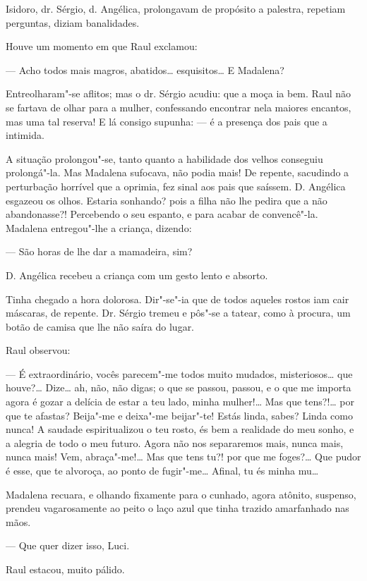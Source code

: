 Isidoro, dr. Sérgio, d. Angélica, prolongavam de propósito a palestra,
repetiam perguntas, diziam banalidades.

Houve um momento em que Raul exclamou:

--- Acho todos mais magros, abatidos\ldots{} esquisitos\ldots{} E Madalena?

Entreolharam"-se aflitos; mas o dr. Sérgio acudiu: que a moça ia bem.
Raul não se fartava de olhar para a mulher, confessando encontrar nela
maiores encantos, mas uma tal reserva! E lá consigo supunha: --- é a
presença dos pais que a intimida.

A situação prolongou"-se, tanto quanto a habilidade dos velhos conseguiu
prolongá"-la. Mas Madalena sufocava, não podia mais! De repente,
sacudindo a perturbação horrível que a oprimia, fez sinal aos pais que
saíssem. D. Angélica esgazeou os olhos. Estaria sonhando? pois a filha
não lhe pedira que a não abandonasse?! Percebendo o seu espanto, e para
acabar de convencê"-la. Madalena entregou"-lhe a criança, dizendo:

--- São horas de lhe dar a mamadeira, sim?

D. Angélica recebeu a criança com um gesto lento e absorto.

Tinha chegado a hora dolorosa. Dir"-se"-ia que de todos aqueles rostos iam
cair máscaras, de repente. Dr. Sérgio tremeu e pôs"-se a tatear, como à
procura, um botão de camisa que lhe não saíra do lugar.

Raul observou:

--- É extraordinário, vocês parecem"-me todos muito mudados,
misteriosos\ldots{} que houve?\ldots{} Dize\ldots{} ah, não, não digas; o que se
passou, passou, e o que me importa agora é gozar a delícia de estar a
teu lado, minha mulher!\ldots{} Mas que tens?!\ldots{} por que te afastas?
Beija"-me e deixa"-me beijar"-te! Estás linda, sabes? Linda como nunca! A
saudade espiritualizou o teu rosto, és bem a realidade do meu sonho, e a
alegria de todo o meu futuro. Agora não nos separaremos mais, nunca
mais, nunca mais! Vem, abraça"-me!\ldots{} Mas que tens tu?! por que me
foges?\ldots{} Que pudor é esse, que te alvoroça, ao ponto de fugir"-me\ldots{}
Afinal, tu és minha mu\ldots{}

Madalena recuara, e olhando fixamente para o cunhado, agora atônito,
suspenso, prendeu vagarosamente ao peito o laço azul que tinha trazido
amarfanhado nas mãos.

--- Que quer dizer isso, Luci.

Raul estacou, muito pálido.

